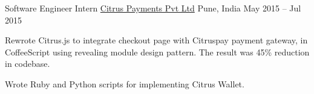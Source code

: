 \begin{cventries}
  \cventry
    {Software Engineer Intern}
    {\href{http://www.citruspay.com/}{Citrus Payments Pvt Ltd}}
    {Pune, India}
    {May 2015 – Jul 2015}
    {
      \begin{cvitems}
        \item {Rewrote Citrus.js to integrate checkout page with Citruspay payment gateway, in CoffeeScript using revealing module design pattern. The result was 45\% reduction in codebase.} 
        \item {Wrote Ruby and Python scripts for implementing Citrus Wallet. }
      \end{cvitems}
    }
    
\end{cventries}
